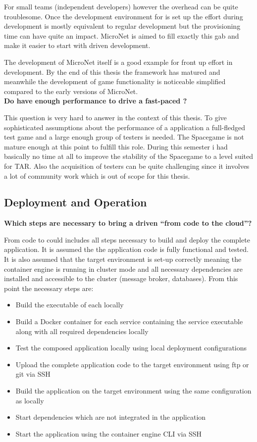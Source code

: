 For small teams (independent developers) however the overhead can be quite
troublesome. Once the development environment for \ms{}is set up the effort
during development is mostly equivalent to regular \og{} development but the
provisioning time can have quite an impact. MicroNet is aimed to fill exactly
this gab and make it easier to start with \ms{} driven \og{} development.

The development of MicroNet itself is a good example for front up effort in
\ms{} development. By the end of this thesis the framework has matured and
meanwhile the development of game functionality is noticeable simplified
compared to the early versions of MicroNet.\\

\noindent
\textbf{Do \mss{} have enough performance to drive a fast-paced \ogs{}?}

This question is very hard to answer in the context of this thesis. To give
sophisticated assumptions about the performance of a \ms{} application a
full-fledged test game and a large enough group of testers is needed. The
Spacegame is not mature enough at this point to fulfill this role. During this
semester i had basically no time at all to improve the stability of the
Spacegame to a level suited for TAR. Also the acquisition of testers can be
quite challenging since it involves a lot of community work which is out of
scope for this thesis.

\subsection{Deployment and Operation}

\noindent
\textbf{Which steps are necessary to bring a \ms{} driven \og{} ``from code to
the cloud''?}

From code to could includes all steps necessary to build and deploy the complete
\ms{} \og{} application. It is assumed the the application code is fully
functional and tested. It is also assumed that the target environment is set-up
correctly meaning the container engine is running in cluster mode and all
necessary dependencies are installed and accessible to the cluster (message
broker, databases). From this point the necessary steps are:

\begin{itemize}
  \item Build the executable of each \ms{} locally
  \item Build a Docker container for each service containing the service
  executable along with all required dependencies locally
  \item Test the composed application locally using local deployment
  configurations
  \item Upload the complete application code to the target environment using ftp
  or git via SSH
  \item Build the application on the target environment using the same
  configuration as locally
  \item Start dependencies which are not integrated in the application
  \item Start the application using the container engine CLI via SSH  
\end{itemize}

